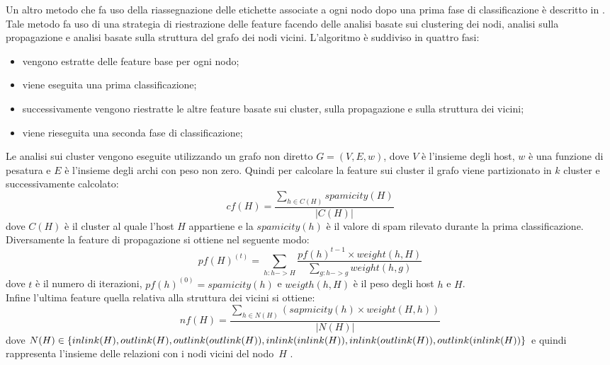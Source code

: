 Un altro metodo che fa uso della riassegnazione delle etichette associate a ogni nodo dopo una prima fase di classificazione è descritto in \cite{Geng:2008:IWS:1367497.1367685}. Tale metodo fa uso di una strategia di riestrazione delle feature facendo delle analisi basate sui clustering dei nodi, analisi sulla propagazione e analisi basate sulla struttura del grafo dei nodi vicini. L'algoritmo è suddiviso in quattro fasi:
\begin{itemize}
 \item vengono estratte delle feature base per ogni nodo;
 \item viene eseguita una prima classificazione;
 \item successivamente vengono riestratte le altre feature basate sui cluster, sulla propagazione e sulla struttura dei vicini;
 \item viene rieseguita una seconda fase di classificazione;
\end{itemize}
Le analisi sui cluster vengono eseguite utilizzando un grafo non diretto \(G=(V,E,w)\), dove \(V\) è l'insieme degli host, \(w\) è una funzione di pesatura e \(E\) è l'insieme degli archi con peso non zero. Quindi per calcolare la feature sui cluster il grafo viene partizionato in \(k\) cluster e successivamente calcolato:
\begin{equation}
 cf(H)=\frac{\sum_{h\in C(H)}spamicity(H)}{|C(H)|}
\end{equation}
dove \(C(H)\) è il cluster al quale l'host \(H\) appartiene e la \(spamicity(h)\) è il valore di spam rilevato durante la prima classificazione.\\
Diversamente la feature di propagazione si ottiene nel seguente modo:
\begin{equation}
 pf(H)^{(t)}=\sum_{h:h->H}\frac{pf(h)^{t-1}\times weight(h,H)}{\sum_{g:h->g}weight(h,g)}
\end{equation}
dove \(t\) è il numero di iterazioni, \(pf(h)^{(0)}=spamicity(h)\) e \(weigth(h,H)\) è il peso degli host \(h\) e \(H\).\\ 
Infine l'ultima feature quella relativa alla struttura dei vicini si ottiene:
\begin{equation}
 nf(H)=\frac{\sum_{h\in N(H)}(sapmicity(h)\times weight(H,h))}{|N(H)|}
\end{equation}
dove \(N(H) \in \{inlink(H), outlink(H), outlink(outlink(H)), inlink(inlink(H)),\\ inlink(outlink(H)), outlink(inlink(H))\}\) e quindi rappresenta l'insieme delle relazioni con i nodi vicini del nodo\ \(H\) .

